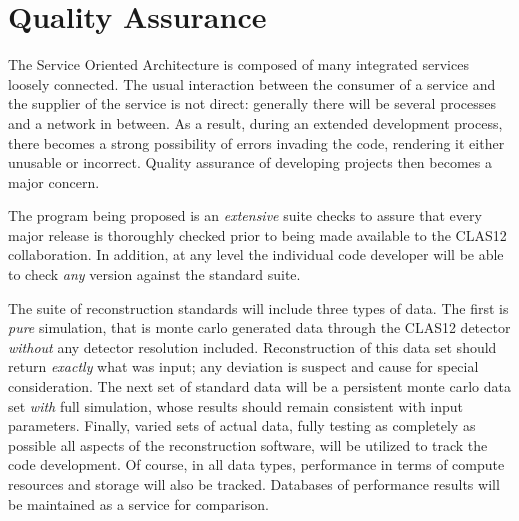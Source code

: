 \section{Quality Assurance}

The Service Oriented Architecture is composed of many integrated services loosely connected. The usual interaction between the consumer of a service and the supplier of the service is not direct: generally there will be several processes and a network in between. As a result, during an extended development process, there becomes a strong possibility of errors invading the code, rendering it either unusable or incorrect. Quality assurance of developing projects then becomes a major concern. 

The program being proposed is an {\it extensive} suite checks to assure that every major release is thoroughly checked prior to being made available to the CLAS12 collaboration. In addition, at any level the individual code developer will be able to check {\it any} version against the standard suite. 

The suite of reconstruction standards will include three types of data. The first is {\it pure} simulation, that is monte carlo generated data through the CLAS12 detector {\it without} any detector resolution included.  Reconstruction of this data set should return {\it exactly} what was input; any deviation is suspect and cause for special consideration. The next set of standard data will be a persistent monte carlo data set {\it with} full simulation, whose results should remain consistent with input parameters. Finally, varied sets of actual data, fully testing as completely as possible all aspects of the reconstruction software, will be utilized to track the code development. Of course, in all data types, performance in terms of compute resources and storage will also be tracked. Databases of performance results will be maintained as a service for comparison.



